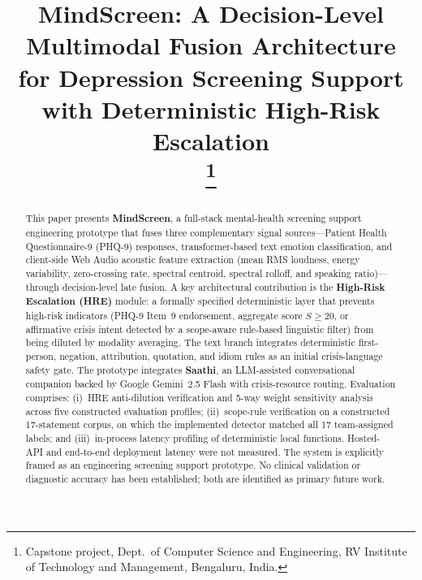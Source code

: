 \documentclass[10pt, conference, letterpaper]{IEEEtran}
\begin{document}
\title{MindScreen: A Decision-Level Multimodal Fusion Architecture
  for Depression Screening Support with Deterministic High-Risk Escalation\\
\thanks{Capstone project, Dept.\ of Computer Science and Engineering,
  RV Institute of Technology and Management, Bengaluru, India.}}

\author{%
}

\maketitle
\thispagestyle{empty}
\pagestyle{empty}

\begin{abstract}
This paper presents \textbf{MindScreen}, a full-stack mental-health screening
support engineering prototype that fuses three
complementary signal sources---Patient Health Questionnaire-9 (PHQ-9) responses,
transformer-based text emotion classification, and client-side Web Audio
acoustic feature extraction (mean RMS loudness, energy variability, zero-crossing
rate, spectral centroid, spectral rolloff, and speaking ratio)---through
decision-level late fusion.
A key architectural contribution is the \textbf{High-Risk Escalation (HRE)}
module: a formally specified deterministic layer that prevents high-risk
indicators (PHQ-9 Item~9 endorsement, aggregate score $S \ge 20$, or affirmative
crisis intent detected by a scope-aware rule-based linguistic filter) from being
diluted by modality averaging.
The text branch integrates deterministic first-person, negation, attribution,
quotation, and idiom rules as an initial crisis-language safety gate.
The prototype integrates \textbf{Saathi}, an LLM-assisted conversational
companion backed by Google Gemini~2.5 Flash with crisis-resource routing.
Evaluation comprises: (i)~HRE anti-dilution verification and 5-way weight
sensitivity analysis across five constructed evaluation profiles;
(ii)~scope-rule verification on a constructed 17-statement corpus, on which the
implemented detector matched all 17 team-assigned labels; and (iii)~in-process
latency profiling of deterministic local functions. Hosted-API and end-to-end
deployment latency were not measured.
The system is explicitly framed as an engineering screening support prototype.
No clinical validation or diagnostic accuracy has been established; both are
identified as primary future work.
\end{abstract}
\end{document}
